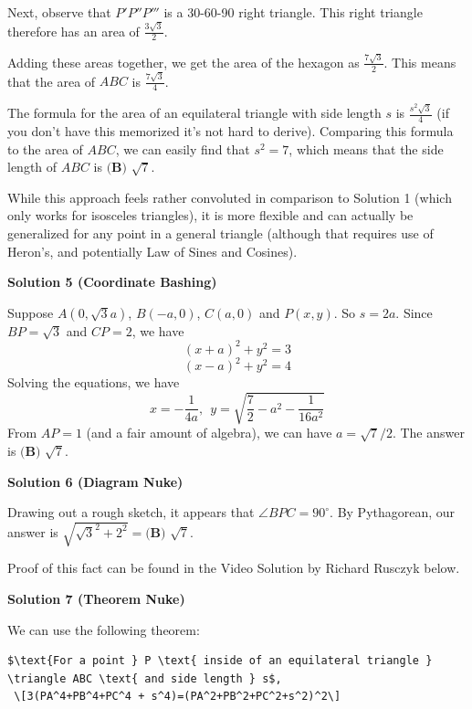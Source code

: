 \begin{enumerate}
 Next, observe that $P'P''P'''$ is a 30-60-90 right triangle. This right triangle therefore has an area of $\frac{3\sqrt{3}}{2}$.

 Adding these areas together, we get the area of the hexagon as $\frac{7\sqrt{3}}{2}$. This means that the area of $ABC$ is $\frac{7\sqrt{3}}{4}$.

 The formula for the area of an equilateral triangle with side length $s$ is $\frac{s^2\sqrt{3}}{4}$ (if you don't have this memorized it's not hard to derive). Comparing this formula to the area of $ABC$, we can easily find that $s^2=7$, which means that the side length of $ABC$ is $\boxed{\textbf{(B) } \sqrt{7}}$.

 While this approach feels rather convoluted in comparison to Solution 1 (which only works for isosceles triangles), it is more flexible and can actually be generalized for any point in a general triangle (although that requires use of Heron's, and potentially Law of Sines and Cosines).

 



\textbf{Solution 5 (Coordinate Bashing)}

Suppose $A(0,\sqrt{3}a)$, $B(-a,0)$, $C(a,0)$ and $P(x,y)$. So $s=2a$. Since $BP = \sqrt{3}$ and $CP = 2$, we have
 \[(x+a)^2+y^2=3\]
 \[(x-a)^2+y^2=4\]Solving the equations, we have 
 \[x=-\frac{1}{4a},~~y=\sqrt{\frac72-a^2-\frac{1}{16a^2}}\] From $AP=1$ (and a fair amount of algebra), we can have $a=\sqrt{7}/2$. The answer is $\boxed{\textbf{(B) } \sqrt{7}}$.

 



\textbf{Solution 6 (Diagram Nuke)}

Drawing out a rough sketch, it appears that $\angle BPC = 90^{\circ}$. By Pythagorean, our answer is $\sqrt{\sqrt{3}^2 + 2^2} = \boxed{\textbf{(B) } \sqrt{7}}$.

 Proof of this fact can be found in the Video Solution by Richard Rusczyk below.

 



\textbf{Solution 7 (Theorem Nuke)}

We can use the following theorem:

 \begin{verbatim}
$\text{For a point } P \text{ inside of an equilateral triangle } \triangle ABC \text{ and side length } s$, 
 \[3(PA^4+PB^4+PC^4 + s^4)=(PA^2+PB^2+PC^2+s^2)^2\]
\end{verbatim}


\end{enumerate}
